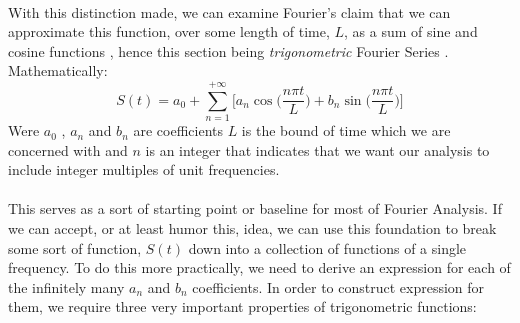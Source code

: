 \documentclass[12pt,letterpaper]{article}
\begin{document}
\paragraph*{}With this distinction made, we can examine Fourier's claim that we can approximate this function, over some length of time, $L$, as a sum of sine and cosine functions \cite{Pinsky,Tolstov}, hence this section being \textit{trigonometric} Fourier Series . Mathematically:
\begin{equation}
\label{Series Def}
S(t) = a_0 + \sum_{n=1}^{+\infty} \Bigg[ a_n \cos\Big(\frac{n\pi t}{L}\Big) + b_n \sin\Big(\frac{n\pi t}{L}\Big) \Bigg]
\end{equation}
Were $a_0$ , $a_n$ and $b_n$ are coefficients $L$ is the bound of time which we are concerned with and $n$ is an integer that indicates that we want our analysis to include integer multiples of unit frequencies.
\paragraph*{}This serves as a sort of starting point or baseline for most of Fourier Analysis. If we can accept, or at least humor this, idea, we can use this foundation to break some sort of function, $S(t)$ down into a collection of functions of a single frequency. To do this more practically, we need to derive an expression for each of the infinitely many $a_n$ and $b_n$ coefficients. In order to construct expression for them, we require three very important properties of trigonometric functions:
\end{document}
